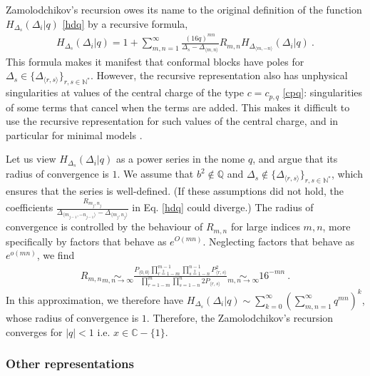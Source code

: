 \documentclass[12pt, a4paper, notitlepage, twoside]{report}
\numberwithin{equation}{section}
\theoremstyle{break}
\begin{document}
Zamolodchikov's recursion owes its name to the original definition of the function $H_{\Delta_s}(\Delta_i|q)$ \eqref{hdq} by a recursive formula,
\begin{align}
 H_{\Delta_s}(\Delta_i|q) = 1 + \sum_{m,n=1}^\infty \frac{(16q)^{mn}}{\Delta_s-\Delta_{\langle m,n\rangle}} R_{m,n} H_{\Delta_{\langle m,-n\rangle}}(\Delta_i|q)\ .
 \label{hrec}
\end{align}
This formula makes it manifest that conformal blocks have poles for $\Delta_s \in \{\Delta_{\langle r,s\rangle}\}_{r,s\in {\mathbb{N}}^*}$. However, the recursive representation also has unphysical singularities at 
values of the central charge of the type $c= c_{p, q}$ \eqref{cpq}: singularities of some terms that cancel when the terms are added. This makes it difficult to use the recursive representation for such values of the central charge, and in particular for minimal models \cite{rib18}.

Let us view $H_{\Delta_s}(\Delta_i|q)$ as a power series in the nome $q$, and argue that its radius of convergence is $1$. We assume that $b^2\notin\mathbb{Q}$ and $\Delta_s \notin \{\Delta_{\langle r,s\rangle}\}_{r,s\in {\mathbb{N}}^*}$, which ensures that the series is well-defined. (If these assumptions did not hold, the coefficients $\frac{R_{m_j,n_j}}{\Delta_{\langle m_{j-1},-n_{j-1} \rangle}-\Delta_{\langle m_j,n_j\rangle}}$ in Eq. \eqref{hdq} could diverge.) The radius of convergence is controlled by the behaviour of $R_{m,n}$ for large indices $m,n$, more specifically by factors that behave as $e^{O(mn)}$. Neglecting factors that behave as $e^{o(mn)}$, we find 
\begin{align}
 R_{m,n} \underset{m,n\to \infty}{\sim } \frac{P_{\langle 0,0\rangle}\prod_{r\overset{2}{=}1-m}^{m-1} \prod_{s\overset{2}{=}1-n}^{n-1} P_{\langle r,s\rangle}^2 }{\prod_{r=1-m}^m \prod_{s=1-n}^n 2P_{\langle r,s\rangle}}
  \underset{m,n\to \infty}{\sim } 16^{-mn}\ .
\end{align}
In this approximation, we therefore have $H_{\Delta_s}(\Delta_i|q)\sim \sum_{k=0}^\infty \left(\sum_{m,n=1}^\infty q^{mn}\right)^k$, whose radius of convergence is $1$. Therefore, the Zamolodchikov's recursion converges for $|q|<1$ i.e. $x\in\mathbb{C}-\{1\}$.



\subsubsection{Other representations}
\end{document}
